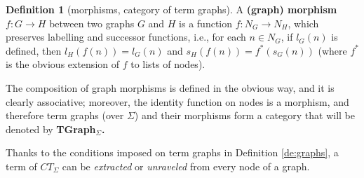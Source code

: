 \documentclass{eptcs}
\theoremstyle{plain}
\theoremstyle{definition}
\newtheorem{definition}[theorem]{Definition}
\begin{document}
\begin{definition}
[morphisms, category of term graphs]
\label{de:morphisms}
A {\bf (graph) morphism} $f: G \rightarrow H$ between two 
graphs
$G$ and $H$ is a function $f: N_G \rightarrow N_H$, which preserves 
labelling and successor functions, i.e., for each $n \in N_G$, if 
$l_G(n)$ is defined, then $l_H(f(n)) = l_G(n)$ and $s_H(f(n)) = 
f^*(s_G(n))$ (where $f^*$ is the obvious extension of $f$ to lists of 
nodes).

The composition of graph morphisms is defined in the obvious way, and 
it 
is clearly associative; moreover, the identity function on nodes is a 
morphism, and therefore term graphs (over $\Sigma$) and their 
morphisms 
form a category that will be denoted by \bf{TGraph$_\Sigma$}.
\end{definition}

Thanks to the conditions imposed on term graphs
in Definition \ref{de:graphs}, a term of $CT_\Sigma$ can be 
{\em extracted} or {\em unraveled} from every node of a graph.
\end{document}
